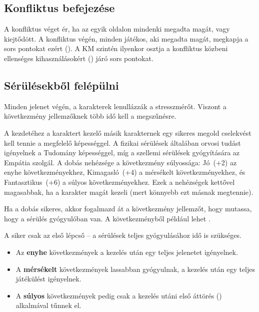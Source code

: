 \subsection{Konfliktus befejezése}

A konfliktus véget ér, ha az egyik oldalon mindenki megadta magát, vagy kiejtődött. A konfliktus végén, minden játékos, aki megadta magát, megkapja a sors pontokat ezért (). A KM szintén ilyenkor osztja a konfliktus közbeni ellenséges kihasználásokért () járó sors pontokat.

\subsection{Sérülésekből felépülni}

Minden jelenet végén, a karakterek lenullázzák a stresszmérőt. Viszont a következmény jellemzőknek több idő kell a megszűnésre.

A  kezdetéhez a karaktert kezelő másik karakternek egy sikeres megold cselekvést kell tennie a megfelelő képességgel. A fizikai sérülések általában orvosi tudást igényelnek a Tudomány képességgel, míg a szellemi sérülések gyógyítására az Empátia szolgál. A dobás nehézsége a következmény súlyossága: Jó~(+2) az enyhe következményekhez, Kimagasló~(+4) a mérsékelt következményekhez, és Fantasztikus~(+6) a súlyos következményekhez. Ezek a nehézségek kettővel magasabbak, ha a karakter magát kezeli (mert könnyebb ezt másnak megtennie).

Ha a dobás sikeres, akkor fogalmazd át a következmény jellemzőt, hogy mutassa, hogy a sérülés gyógyulóban van. A  következményből például lehet .

A siker csak az első lépcső – a sérülések teljes gyógyulásához idő is szükséges.

\begin{itemize}
    \item Az \textbf{enyhe} következmények a kezelés után egy teljes jelenetet igényelnek.
    \item A \textbf{mérsékelt} következmények lassabban gyógyulnak, a kezelés után egy teljes játékülést igényelnek.
    \item A \textbf{súlyos} következmények pedig csak a kezelés utáni első áttörés () alkalmával tűnnek el.
\end{itemize}
